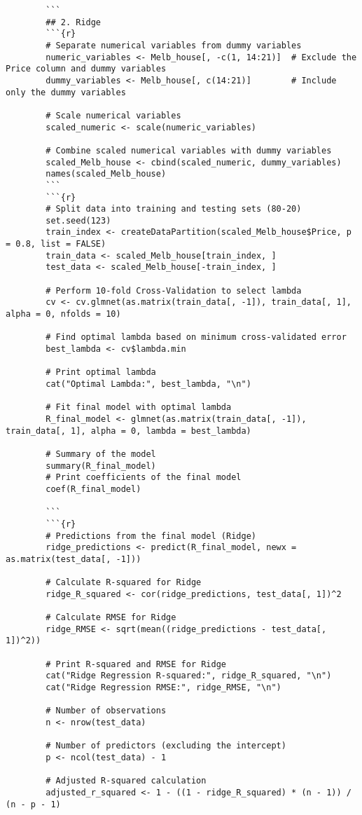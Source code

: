 \documentclass[12pt,doublespace]{article}
\begin{document}
\begin{lstlisting}
		```
		## 2. Ridge
		```{r}
		# Separate numerical variables from dummy variables
		numeric_variables <- Melb_house[, -c(1, 14:21)]  # Exclude the Price column and dummy variables
		dummy_variables <- Melb_house[, c(14:21)]        # Include only the dummy variables
		
		# Scale numerical variables
		scaled_numeric <- scale(numeric_variables)
		
		# Combine scaled numerical variables with dummy variables
		scaled_Melb_house <- cbind(scaled_numeric, dummy_variables)
		names(scaled_Melb_house)
		```
		```{r}
		# Split data into training and testing sets (80-20)
		set.seed(123)
		train_index <- createDataPartition(scaled_Melb_house$Price, p = 0.8, list = FALSE)
		train_data <- scaled_Melb_house[train_index, ]
		test_data <- scaled_Melb_house[-train_index, ]
		
		# Perform 10-fold Cross-Validation to select lambda
		cv <- cv.glmnet(as.matrix(train_data[, -1]), train_data[, 1], alpha = 0, nfolds = 10)
		
		# Find optimal lambda based on minimum cross-validated error
		best_lambda <- cv$lambda.min
		
		# Print optimal lambda
		cat("Optimal Lambda:", best_lambda, "\n")
		
		# Fit final model with optimal lambda
		R_final_model <- glmnet(as.matrix(train_data[, -1]), train_data[, 1], alpha = 0, lambda = best_lambda)
		
		# Summary of the model
		summary(R_final_model)
		# Print coefficients of the final model
		coef(R_final_model)
		
		```
		```{r}
		# Predictions from the final model (Ridge)
		ridge_predictions <- predict(R_final_model, newx = as.matrix(test_data[, -1]))
		
		# Calculate R-squared for Ridge
		ridge_R_squared <- cor(ridge_predictions, test_data[, 1])^2
		
		# Calculate RMSE for Ridge
		ridge_RMSE <- sqrt(mean((ridge_predictions - test_data[, 1])^2))
		
		# Print R-squared and RMSE for Ridge
		cat("Ridge Regression R-squared:", ridge_R_squared, "\n")
		cat("Ridge Regression RMSE:", ridge_RMSE, "\n")
		
		# Number of observations
		n <- nrow(test_data)
		
		# Number of predictors (excluding the intercept)
		p <- ncol(test_data) - 1
		
		# Adjusted R-squared calculation
		adjusted_r_squared <- 1 - ((1 - ridge_R_squared) * (n - 1)) / (n - p - 1)
		

\end{lstlisting}
\end{document}
